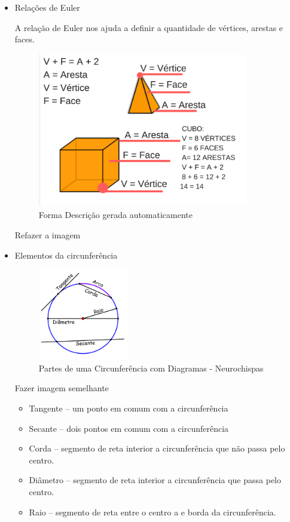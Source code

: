 \begin{escolha}
{{{\begin{escolha}
{{{{{{\begin{itemize}
Fazer figura semelhante

  \item Relações de Euler

A relação de Euler nos ajuda a definir a quantidade de vértices, arestas
e faces.

\begin{figure}
\centering
\includegraphics[width=3.61979in,height=2.66667in]{./_SAEB_9_MAT/media/image162.png}
\caption{Forma Descrição gerada automaticamente}
\end{figure}

Refazer a imagem

  \item Elementos da circunferência

\begin{figure}
\centering
\includegraphics[width=1.53027in,height=1.57292in]{./_SAEB_9_MAT/media/image163.png}
\caption{Partes de uma Circunferência com Diagramas - Neurochispas}
\end{figure}

Fazer imagem semelhante

\begin{itemize}
\item
  Tangente -- um ponto em comum com a circunferência
\item
  Secante -- dois pontos em comum com a circunferência
\item
  Corda -- segmento de reta interior a circunferência que não passa pelo
  centro.
\item
  Diâmetro -- segmento de reta interior a circunferência que passa pelo
  centro.
\item
  Raio -- segmento de reta entre o centro a e borda da circunferência.
\end{itemize}


\end{itemize}}}}}}}
\end{escolha}}}}
\end{escolha}
